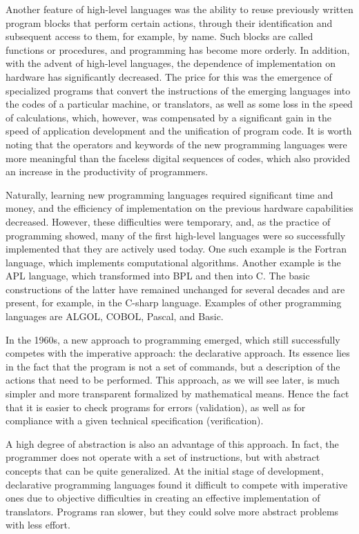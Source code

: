 \documentclass[12pt]{book}
\begin{document}
Another feature of high-level languages was the ability to reuse previously written program blocks that perform certain actions, through their identification and subsequent access to them, for example, by name. Such blocks are called functions or procedures, and programming has become more orderly. In addition, with the advent of high-level languages, the dependence of implementation on hardware has significantly decreased. The price for this was the emergence of specialized programs that convert the instructions of the emerging languages into the codes of a particular machine, or translators, as well as some loss in the speed of calculations, which, however, was compensated by a significant gain in the speed of application development and the unification of program code. It is worth noting that the operators and keywords of the new programming languages were more meaningful than the faceless digital sequences of codes, which also provided an increase in the productivity of programmers.

Naturally, learning new programming languages required significant time and money, and the efficiency of implementation on the previous hardware capabilities decreased. However, these difficulties were temporary, and, as the practice of programming showed, many of the first high-level languages were so successfully implemented that they are actively used today. One such example is the Fortran language, which implements computational algorithms. Another example is the APL language, which transformed into BPL and then into C. The basic constructions of the latter have remained unchanged for several decades and are present, for example, in the C-sharp language. Examples of other programming languages are ALGOL, COBOL, Pascal, and Basic.

In the 1960s, a new approach to programming emerged, which still successfully competes with the imperative approach: the declarative approach. Its essence lies in the fact that the program is not a set of commands, but a description of the actions that need to be performed. This approach, as we will see later, is much simpler and more transparent formalized by mathematical means. Hence the fact that it is easier to check programs for errors (validation), as well as for compliance with a given technical specification (verification).

A high degree of abstraction is also an advantage of this approach. In fact, the programmer does not operate with a set of instructions, but with abstract concepts that can be quite generalized. At the initial stage of development, declarative programming languages found it difficult to compete with imperative ones due to objective difficulties in creating an effective implementation of translators. Programs ran slower, but they could solve more abstract problems with less effort.
\end{document}
